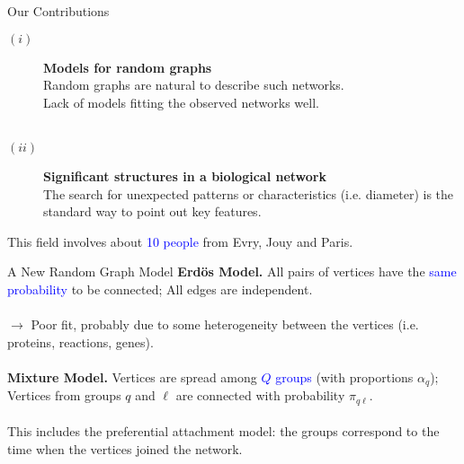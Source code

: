 \documentclass[pdf,mia,noFooter,slideColor,colorBG]{prosper}
\newcommand{\emphase}[1]{{\textcolor{blue}{{#1}}}}
\renewcommand{\paragraph}[1]{{\large \bf  #1}}
\begin{document}
\begin{slide}{Our Contributions}
\begin{description}
\item[$(i)$] \paragraph{Models for random graphs} \\
  Random graphs are natural to describe such networks. \\
  Lack of models fitting the observed networks well. \\
  ~\\
\item[$(ii)$] \paragraph{Significant structures in a biological
    network} \\
  The search for unexpected patterns or characteristics (i.e.
  diameter) is the standard way to point out key features.
\end{description}
This field involves about \emphase{10 people} from Evry, Jouy and
Paris.
\end{slide}

\begin{slide}{A New Random Graph Model}
  \paragraph{Erd\"os Model.} All pairs of vertices have the \emphase{same
    probability} to be connected; All edges are independent. \\
  ~\\
  $\rightarrow$ Poor fit, probably due to some heterogeneity between
  the vertices (i.e. proteins, reactions, genes). \\
  ~\\
  \paragraph{Mixture Model.} Vertices are spread among \emphase{$Q$ groups}
  (with proportions $\alpha_q$); Vertices from groups $q$ and $\ell$
  are connected with probability $\pi_{q\ell}$. \\
  ~\\
  This includes the preferential attachment model: the groups
  correspond to the time when the vertices joined the network.
\end{slide}
\end{document}
